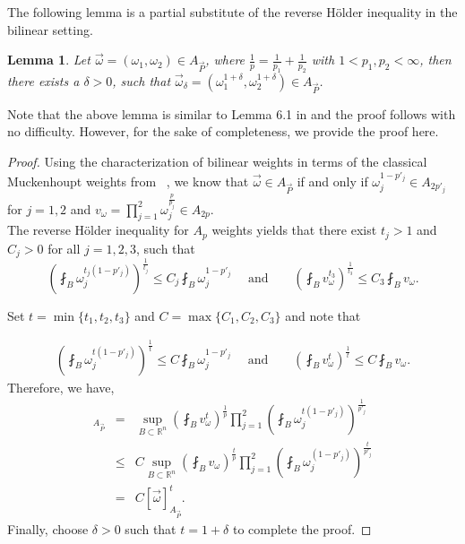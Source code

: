 \documentclass[a4paper,12pt]{amsart}
\newtheorem{lemma}[theorem]{Lemma}
\begin{document}
The following lemma is a partial substitute of the reverse H\"{o}lder inequality in the bilinear setting. 
\begin{lemma}\label{prop:wei}
Let $\vec{\omega}=(\omega_{1},\omega_{2})\in A_{\vec{P}}$, where $\frac{1}{p}=\frac{1}{p_{1}}+\frac{1}{p_{2}}$ with $1<p_1,p_2 <\infty$, then there exists a $\delta>0$, such that $\vec{\omega}_{\delta}=(\omega^{1+\delta}_{1},\omega^{1+\delta}_{2})\in A_{\vec{P}}$. 

\end{lemma}
Note that the above lemma is similar to Lemma 6.1 in \cite{Ler1} and the proof follows with no difficulty. However, for the sake of completeness, we provide the proof here. 
\begin{proof}
Using the characterization of bilinear weights in terms of the classical Muckenhoupt weights from~ \cite{Ler1}, we know that $\vec{\omega}\in A_{\vec{P}}$ if and only if $\omega^{1-p'_{j}}_{j}\in A_{2p'_{j}}$ for $j=1,2$ and $v_{\omega}=\prod^{2}_{j=1}\omega^{\frac{p}{p_{j}}}_{j}\in A_{2p}$.\\ 
The reverse H\"{o}lder inequality for $A_p$ weights yields that there exist $t_{j}>1$ and $C_{j}>0$ for all $j=1,2,3$, such that $$\left(\fint_{B}\omega^{t_{j}(1-p'_{j})}_{j}\right)^{\frac{1}{t_{j}}}\leq C_{j}\fint_{B}\omega^{1-p'_{j}}_{j}~~~\ \ \ \text{and}~~~~\ \ \ \ \  \left(\fint_{B}v^{t_{3}}_{\omega}\right)^{\frac{1}{t_{3}}}\leq C_{3}\fint_{B}v_{\omega}.$$

Set $t=\min\lbrace t_{1},t_2,t_{3}\rbrace$ and $C=\max\lbrace C_{1},C_2,C_{3}\rbrace$ and note that  

\begin{eqnarray*} \left(\fint_{B}\omega^{t(1-p'_{j})}_{j}\right)^{\frac{1}{t}}\leq C\fint_{B}\omega^{1-p'_{j}}_{j}
~~~\ \ \ \text{and}~~~~\ \ \ \ \ \left(\fint_{B}v^{t}_{\omega}\right)^{\frac{1}{t}}\leq C\fint_{B}v_{\omega}.
\end{eqnarray*}
Therefore, we have, 
\begin{eqnarray*}[\vec{\omega}_{t}]_{A_{\vec{P}}}
&=&\sup_{B\subset \mathbb{R}^{n}}\left(\fint_{B}v^{t}_{\omega}\right)^{\frac{1}{p}}\prod^{2}_{j=1}\left(\fint_{B}\omega^{t(1-p'_{j})}_{j}\right)^{\frac{1}{p'_{j}}}\\
&\leq & C \sup_{B\subset \mathbb{R}^{n}}\left(\fint_{B}v_{\omega}\right)^{\frac{t}{p}}\prod^{2}_{j=1}\left(\fint_{B}\omega^{(1-p'_{j})}_{j}\right)^{\frac{t}{p'_{j}}}\\
&=& C [\vec{\omega}]^{t}_{A_{\vec{P}}}.
\end{eqnarray*}
Finally, choose $\delta>0$ such that $t=1+\delta$ to complete the proof. 
\end{proof}
\end{document}
